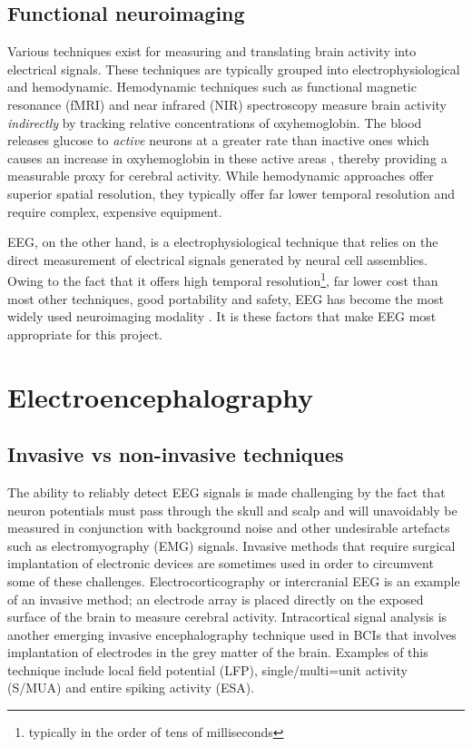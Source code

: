\subsection{Functional neuroimaging}
Various techniques exist for measuring and translating brain activity into electrical signals. These techniques are typically grouped into electrophysiological and hemodynamic. Hemodynamic techniques such as functional magnetic resonance (fMRI) and near infrared (NIR) spectroscopy measure brain activity \textit{indirectly }by tracking relative concentrations of oxyhemoglobin. The blood releases glucose to \textit{active} neurons at a greater rate than inactive ones which causes an increase in oxyhemoglobin in these active areas \cite{bci-survey-nicolas-alonso}, thereby providing a measurable proxy for cerebral activity. While hemodynamic approaches offer superior spatial resolution, they typically offer far lower temporal resolution and require complex, expensive equipment. 

EEG, on the other hand, is a electrophysiological technique that relies on the direct measurement of electrical signals generated by neural cell assemblies. Owing to the fact that it offers high temporal resolution\footnote{typically in the order of tens of milliseconds}, far lower cost than most other techniques, good portability and safety, EEG has become the most widely used neuroimaging modality \cite{bci-survey-nicolas-alonso}. It is these factors that make EEG most appropriate for this project.

\section{Electroencephalography}

\subsection{Invasive vs non-invasive techniques}

The ability to reliably detect EEG signals is made challenging by the fact that neuron potentials must pass through the skull and scalp and will unavoidably be measured in conjunction with background noise and other undesirable artefacts such as electromyography (EMG) signals. Invasive methods that require surgical implantation of electronic devices are sometimes used in order to circumvent some of these challenges. Electrocorticography or intercranial EEG is an example of an invasive method; an electrode array is placed directly on the exposed surface of the brain to measure cerebral activity. Intracortical signal analysis is another emerging invasive encephalography technique used in BCIs that involves implantation of electrodes in the grey matter of the brain. Examples of this technique include local field potential (LFP), single/multi=unit activity (S/MUA) and entire spiking activity (ESA).

